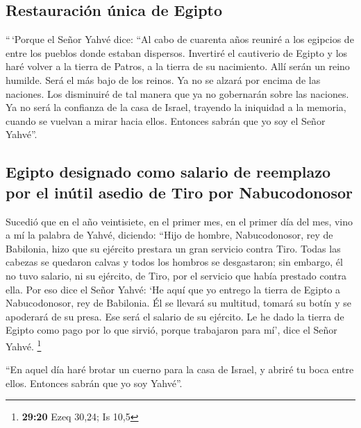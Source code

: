 \hypertarget{restauraciuxf3n-uxfanica-de-egipto}{%
\subsection{Restauración única de
Egipto}\label{restauraciuxf3n-uxfanica-de-egipto}}

 ``\,`Porque el Señor Yahvé dice: ``Al cabo de cuarenta
años reuniré a los egipcios de entre los pueblos donde estaban
dispersos.  Invertiré el cautiverio de Egipto y los haré
volver a la tierra de Patros, a la tierra de su nacimiento. Allí serán
un reino humilde.  Será el más bajo de los reinos. Ya no
se alzará por encima de las naciones. Los disminuiré de tal manera que
ya no gobernarán sobre las naciones.  Ya no será la
confianza de la casa de Israel, trayendo la iniquidad a la memoria,
cuando se vuelvan a mirar hacia ellos. Entonces sabrán que yo soy el
Señor Yahvé''.

\hypertarget{egipto-designado-como-salario-de-reemplazo-por-el-inuxfatil-asedio-de-tiro-por-nabucodonosor}{%
\subsection{Egipto designado como salario de reemplazo por el inútil
asedio de Tiro por
Nabucodonosor}\label{egipto-designado-como-salario-de-reemplazo-por-el-inuxfatil-asedio-de-tiro-por-nabucodonosor}}

 Sucedió que en el año veintisiete, en el primer mes, en
el primer día del mes, vino a mí la palabra de Yahvé, diciendo:
 ``Hijo de hombre, Nabucodonosor, rey de Babilonia, hizo
que su ejército prestara un gran servicio contra Tiro. Todas las cabezas
se quedaron calvas y todos los hombros se desgastaron; sin embargo, él
no tuvo salario, ni su ejército, de Tiro, por el servicio que había
prestado contra ella.  Por eso dice el Señor Yahvé: `He
aquí que yo entrego la tierra de Egipto a Nabucodonosor, rey de
Babilonia. Él se llevará su multitud, tomará su botín y se apoderará de
su presa. Ese será el salario de su ejército.  Le he dado
la tierra de Egipto como pago por lo que sirvió, porque trabajaron para
mí', dice el Señor Yahvé. \footnote{\textbf{29:20} Ezeq 30,24; Is 10,5}

 ``En aquel día haré brotar un cuerno para la casa de
Israel, y abriré tu boca entre ellos. Entonces sabrán que yo soy
Yahvé''.

